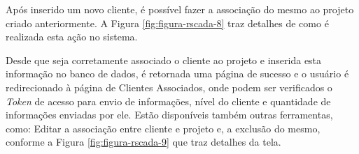 Após inserido um novo cliente, é possível fazer a associação do mesmo ao projeto criado anteriormente. A Figura \ref{fig:figura-rscada-8} traz detalhes de como é realizada esta ação no sistema.
    	
        \begin{figure}[!h]
    	\end{figure}

Desde que seja corretamente associado o cliente ao projeto e inserida esta informação no banco de dados, é retornada uma página de sucesso e o usuário é redirecionado à página de Clientes Associados, onde podem ser verificados o \textit{Token} de acesso para envio de informações, nível do cliente e quantidade de informações enviadas por ele. Estão disponíveis também outras ferramentas, como: Editar a associação entre cliente e projeto e, a exclusão do mesmo, conforme a Figura \ref{fig:figura-rscada-9} que traz detalhes da tela.

        \begin{figure}[!h]
    	\end{figure}